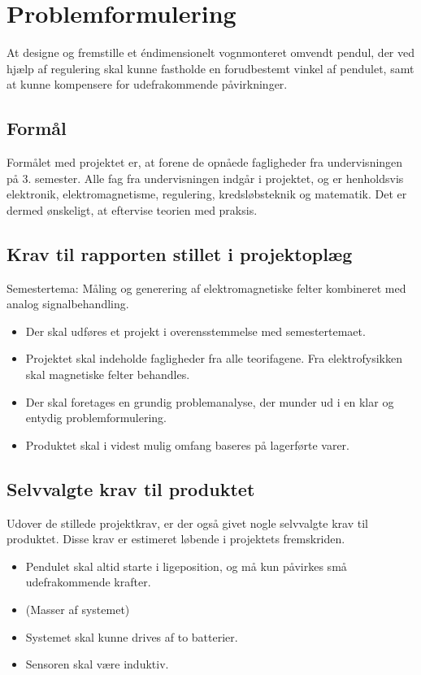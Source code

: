 
\section{Problemformulering}
At designe og fremstille et éndimensionelt vognmonteret omvendt pendul, der ved hjælp af regulering skal kunne fastholde en forudbestemt vinkel af pendulet, samt at kunne kompensere for udefrakommende påvirkninger. 

\subsection{Formål}
Formålet med projektet er, at forene de opnåede fagligheder fra undervisningen på 3. semester. 
Alle fag fra undervisningen indgår i projektet, og er henholdsvis elektronik, elektromagnetisme, regulering, kredsløbsteknik og matematik.
Det er dermed ønskeligt, at eftervise teorien med praksis. 


\subsection{Krav til rapporten stillet i projektoplæg}
Semestertema: Måling og generering af elektromagnetiske felter kombineret med analog signalbehandling.
\begin{itemize}
\item Der skal udføres et projekt i overensstemmelse med semestertemaet.
\item Projektet skal indeholde fagligheder fra alle teorifagene. Fra elektrofysikken skal
magnetiske felter behandles.
\item Der skal foretages en grundig problemanalyse, der munder ud i en klar og entydig
problemformulering.
\item Produktet skal i videst mulig omfang baseres på lagerførte varer.
\end{itemize}

\subsection{Selvvalgte krav til produktet} \label{afs:kravspecifikation}
Udover de stillede projektkrav, er der også givet nogle selvvalgte krav til produktet. Disse krav er estimeret løbende i projektets fremskriden.
\begin{itemize}
\item Pendulet skal altid starte i ligeposition, og må kun påvirkes små udefrakommende krafter.
\item (Masser af systemet)
\item Systemet skal kunne drives af to batterier.
\item Sensoren skal være induktiv.
\end{itemize}

